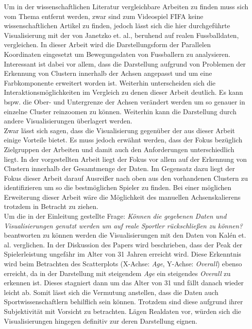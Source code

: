 \documentclass[usegeometry=true]{scrartcl}
\begin{document}
Um in der wissenschaftlichen Literatur vergleichbare Arbeiten zu finden muss sich vom Thema entfernt werden, zwar sind zum Videospiel FIFA keine wissenschaftlichen Artikel zu finden, jedoch lässt sich die hier durchgeführte Visualisierung mit der von Janetzko et. al.\cite{janetzko_enhancing_2016}, beruhend auf realen Fussballdaten, vergleichen.
In dieser Arbeit wird die Darstellungsform der Parallelen Koordinaten eingesetzt um Bewegungsdaten von Fussballern zu analysieren. Interessant ist dabei vor allem, dass die Darstellung aufgrund von Problemen der Erkennung von Clustern innerhalb der Achsen angepasst und um eine Farbkomponente erweitert worden ist. Weiterhin unterscheiden sich die Interaktionsmöglichkeiten im Vergleich zu denen dieser Arbeit deutlich. Es kann bspw. die Ober- und Untergrenze der Achsen verändert werden um so genauer in einzelne Cluster reinzoomen zu können. Weiterhin kann die Darstellung durch andere Visualisierungen überlagert werden.\\
Zwar lässt sich sagen, dass die Visualisierung gegenüber der aus dieser Arbeit einige Vorteile bietet. Es muss jedoch erwähnt werden, dass der Fokus bezüglich Zielgruppen der Arbeiten und damit auch den Anforderungen unterschiedlich liegt. In der vorgestellten Arbeit liegt der Fokus vor allem auf der Erkennung von Clustern innerhalb der Gesamtmenge der Daten. Im Gegensatz dazu liegt der Fokus dieser Arbeit darauf Ausreißer nach oben aus den vorhandenen Clustern zu identifizieren um so die bestmöglichen Spieler zu finden.
Bei einer möglichen Erweiterung dieser Arbeit wäre die Möglichkeit des manuellen Achsenskalierens trotzdem in Betracht zu ziehen.\\
Um die in der Einleitung gestellte Frage: \textit{Können die gegebenen Daten und Visualisierungen genutzt werden um auf reale Sportler rückschließen zu können?} beantworten zu können werden die Visualisierungen mit den Daten von Kalén et. al.\cite{kalen_are_2019} verglichen. In der Diskussion des Papers wird beschrieben, dass der Peak der Spielerleistung ungefähr im Alter von 31 Jahren erreicht wird. Diese Erkenntnis wird beim Betrachten des Scatterplots (X-Achse: \textit{Age}, Y-Achse: \textit{Overall}) ebenso erreicht, da in der Darstellung mit steigendem \textit{Age} ein steigendes \textit{Overall} zu erkennen ist. Dieses stagniert dann um das Alter von 31 und fällt danach wieder leicht ab. Somit lässt sich die Vermutung anstellen, dass die Daten auch Sportwissenschaftlern behilflich sein können. Trotzdem sind diese aufgrund ihrer Subjektivität mit Vorsicht zu betrachten. Lägen Realdaten vor, würden sich die Visualisierungen hingegen definitiv zur deren Darstellung eignen.    
\end{document}
